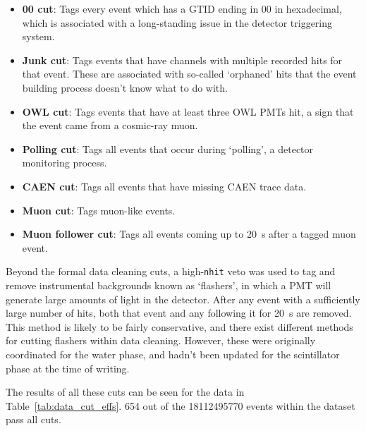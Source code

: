 \begin{itemize}
    \item \textbf{00 cut}: Tags every event which has a GTID ending in 00 in hexadecimal, which is associated with a long-standing issue in the detector triggering system.
    \item \textbf{Junk cut}: Tags events that have channels with multiple recorded hits for that event. These are associated with so-called `orphaned' hits that the event building process doesn't know what to do with.
    \item \textbf{OWL cut}: Tags events that have at least three OWL PMTs hit, a sign that the event came from a cosmic-ray muon.
    \item \textbf{Polling cut}: Tags all events that occur during `polling', a detector monitoring process.
    \item \textbf{CAEN cut}: Tags all events that have missing CAEN trace data.
    \item \textbf{Muon cut}: Tags muon-like events.
    \item \textbf{Muon follower cut}: Tags all events coming up to \SI{20}{\second} after a tagged muon event.
\end{itemize}

Beyond the formal data cleaning cuts, a high-\texttt{nhit} veto was used to tag and remove instrumental backgrounds known as `flashers', in which a PMT will generate large amounts of light in the detector. After any event with a sufficiently large number of hits, both that event and any following it for \SI{20}{\second} are removed. This method is likely to be fairly conservative, and there exist different methods for cutting flashers within data cleaning. However, these were originally coordinated for the water phase, and hadn't been updated for the scintillator phase at the time of writing.

The results of all these cuts can be seen for the data in Table~\ref{tab:data_cut_effs}. 654 out of the \num{18112495770} events within the dataset pass all cuts.

